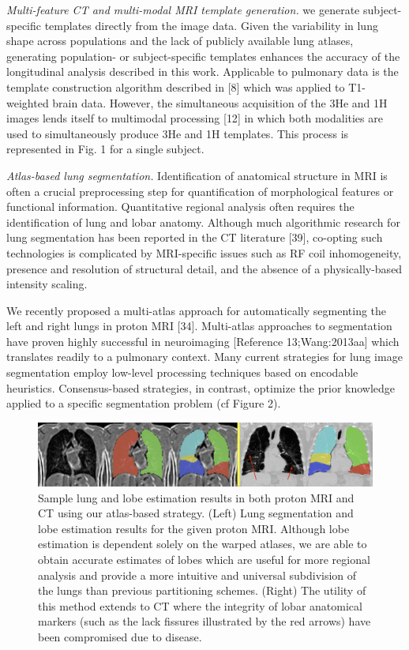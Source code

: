 \documentclass[11pt,]{article}
\begin{document}
\emph{Multi-feature CT and multi-modal MRI template generation.} we
generate subject-specific templates directly from the image data. Given
the variability in lung shape across populations and the lack of
publicly available lung atlases, generating population- or
subject-specific templates enhances the accuracy of the longitudinal
analysis described in this work. Applicable to pulmonary data is the
template construction algorithm described in {[}8{]} which was applied
to T1-weighted brain data. However, the simultaneous acquisition of the
3He and 1H images lends itself to multimodal processing {[}12{]} in
which both modalities are used to simultaneously produce 3He and 1H
templates. This process is represented in Fig. 1 for a single subject.

\emph{Atlas-based lung segmentation.} Identification of anatomical
structure in MRI is often a crucial preprocessing step for
quantification of morphological features or functional information.
Quantitative regional analysis often requires the identification of lung
and lobar anatomy. Although much algorithmic research for lung
segmentation has been reported in the CT literature {[}39{]}, co-opting
such technologies is complicated by MRI-specific issues such as RF coil
inhomogeneity, presence and resolution of structural detail, and the
absence of a physically-based intensity scaling.

We recently proposed a multi-atlas approach for automatically segmenting
the left and right lungs in proton MRI {[}34{]}. Multi-atlas approaches
to segmentation have proven highly successful in neuroimaging
{[}Reference 13;Wang:2013aa{]} which translates readily to a pulmonary
context. Many current strategies for lung image segmentation employ
low-level processing techniques based on encodable heuristics.
Consensus-based strategies, in contrast, optimize the prior knowledge
applied to a specific segmentation problem (cf Figure 2).

\begin{figure}[htbp]
\centering
\includegraphics{Figs/lungEstimation.png}
\caption{Sample lung and lobe estimation results in both proton MRI and
CT using our atlas-based strategy. (Left) Lung segmentation and lobe
estimation results for the given proton MRI. Although lobe estimation is
dependent solely on the warped atlases, we are able to obtain accurate
estimates of lobes which are useful for more regional analysis and
provide a more intuitive and universal subdivision of the lungs than
previous partitioning schemes. (Right) The utility of this method
extends to CT where the integrity of lobar anatomical markers (such as
the lack fissures illustrated by the red arrows) have been compromised
due to disease.}
\end{figure}
\end{document}
